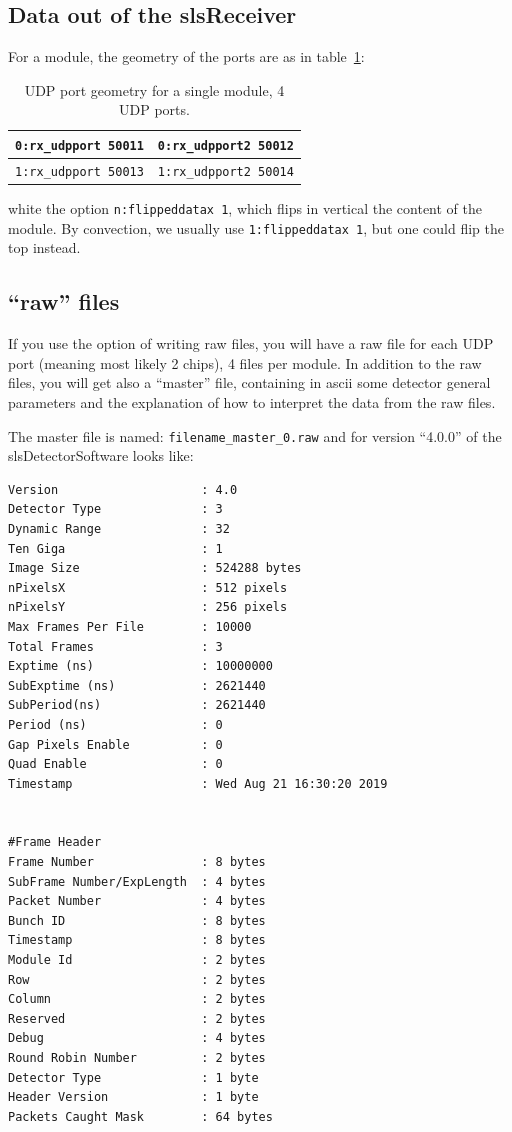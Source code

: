 \documentclass{article}
\begin{document}
{{{\subsection{Data out of the slsReceiver}


For a module, the geometry of the ports are as in table~\ref{tports}: 
\begin{table}
\begin{tabular}{|c|c|}
\hline
{\tt{0:rx\_udpport 50011}} &  {\tt{0:rx\_udpport2 50012}}\\  
\hline
{\tt{1:rx\_udpport 50013}} &  {\tt{1:rx\_udpport2 50014}}\\  
\hline
\end{tabular}
\caption{UDP port geometry for a single module, 4 UDP ports.}
\label{tports}
\end{table}
white the option {\tt{n:flippeddatax 1}}, which flips in vertical the content of the module. By convection, we usually use {\tt{1:flippeddatax 1}}, but one could flip the top instead.


\subsection{``raw'' files}
If you use the option of writing raw files, you will have a raw file for each UDP port (meaning most likely 2 chips), 4 files per module. In addition to the raw files, you will get also a ``master'' file, containing in ascii some detector general parameters and the explanation of how to interpret the data from the raw files.
   
The master file is named: {\tt{filename\_master\_0.raw}} and for version ``4.0.0'' of the slsDetectorSoftware looks like:
 
\begin{verbatim}
Version                    : 4.0
Detector Type              : 3
Dynamic Range              : 32
Ten Giga                   : 1
Image Size                 : 524288 bytes
nPixelsX                   : 512 pixels
nPixelsY                   : 256 pixels
Max Frames Per File        : 10000
Total Frames               : 3
Exptime (ns)               : 10000000
SubExptime (ns)            : 2621440
SubPeriod(ns)              : 2621440
Period (ns)                : 0
Gap Pixels Enable          : 0
Quad Enable                : 0
Timestamp                  : Wed Aug 21 16:30:20 2019


#Frame Header
Frame Number               : 8 bytes
SubFrame Number/ExpLength  : 4 bytes
Packet Number              : 4 bytes
Bunch ID                   : 8 bytes
Timestamp                  : 8 bytes
Module Id                  : 2 bytes
Row                        : 2 bytes
Column                     : 2 bytes
Reserved                   : 2 bytes
Debug                      : 4 bytes
Round Robin Number         : 2 bytes
Detector Type              : 1 byte
Header Version             : 1 byte
Packets Caught Mask        : 64 bytes
\end{verbatim}

}}}
\end{document}
